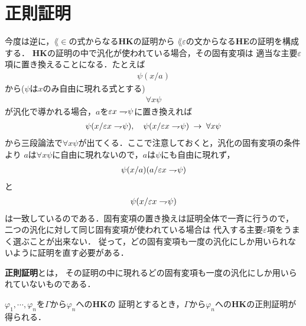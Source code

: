 \section{正則証明}
	今度は逆に，$\lang{\in}$の式からなる{\bf HK}の証明から
	$\lang{\varepsilon}$の文からなる{\bf HE}の証明を構成する．
	{\bf HK}の証明の中で汎化が使われている場合，その固有変項は
	適当な主要$\varepsilon$項に置き換えることになる．たとえば
	\begin{align}
		\psi(x/a)
	\end{align}
	から($\psi$は$x$のみ自由に現れる式とする)
	\begin{align}
		\forall x \psi
	\end{align}
	が汎化で導かれる場合，$a$を$\varepsilon x \rightharpoondown\hspace{-0.25em} \psi$に置き換えれば
	\begin{align}
		\psi(x/\varepsilon x \rightharpoondown\hspace{-0.25em} \psi), 
		\quad \psi(x/\varepsilon x \rightharpoondown\hspace{-0.25em} \psi) \hspace{0.25em}\rightarrow\hspace{0.25em} \forall x \psi
	\end{align}
	から三段論法で$\forall x \psi$が出てくる．ここで注意しておくと，汎化の固有変項の条件より
	$a$は$\forall x \psi$に自由に現れないので，$a$は$\psi$にも自由に現れず，
	\begin{align}
		\psi(x/a)(a/\varepsilon x \rightharpoondown\hspace{-0.25em} \psi)
	\end{align}
	と
	\begin{align}
		\psi(x/\varepsilon x \rightharpoondown\hspace{-0.25em} \psi)
	\end{align}
	は一致しているのである．固有変項の置き換えは証明全体で一斉に行うので，
	二つの汎化に対して同じ固有変項が使われている場合は
	代入する主要$\varepsilon$項をうまく選ぶことが出来ない．
	従って，どの固有変項も一度の汎化にしか用いられないように証明を直す必要がある．
	
	\begin{screen}
		\begin{metadfn}[正則証明]
			{\bf 正則証明}とは，
			その証明の中に現れるどの固有変項も一度の汎化にしか用いられていないものである．
		\end{metadfn}
	\end{screen}
	
	\begin{screen}
		\begin{metathm}[どんな証明も正則化できる]
			$\varphi_{1},\cdots,\varphi_{n}$を$\Gamma$から$\varphi_{n}$への{\bf HK}の
			証明とするとき，$\Gamma$から$\varphi_{n}$への{\bf HK}の正則証明が得られる．
		\end{metathm}
	\end{screen}
	
